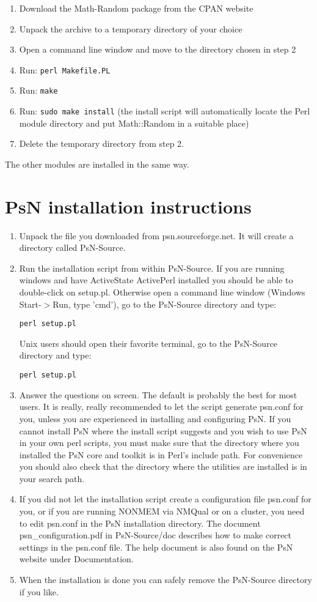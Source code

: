 \documentclass[a4paper,12pt]{article}
\begin{document}
\begin{enumerate}
\item Download the Math-Random package from the CPAN website 
\item Unpack the archive to a temporary directory of your choice 
\item Open a command line window and move to the directory chosen in step 2 
\item Run: \verb|perl Makefile.PL|
\item Run: \verb|make| 
\item Run: \verb|sudo make install| (the install script will automatically locate the Perl module directory and put Math::Random in a suitable place) 
\item Delete the temporary directory from step 2.
\end{enumerate}

The other modules are installed in the same way.

\section{PsN installation instructions}

\begin{enumerate}
\item Unpack the file you downloaded from psn.sourceforge.net. It will create a directory called PsN-Source.
\item Run the installation script from within PsN-Source. If you are running windows and have ActiveState ActivePerl installed you should be able to double-click on setup.pl. Otherwise open a command line window (Windows Start-$>$Run, type 'cmd'), go to the PsN-Source directory and type: 
\begin{verbatim}
perl setup.pl
\end{verbatim}
Unix users should open their favorite terminal, go to the PsN-Source directory and type:
\begin{verbatim}
perl setup.pl
\end{verbatim}
\item Answer the questions on screen. The default is probably the best for most users. It is really, really recommended to let the script generate psn.conf for you, unless you are experienced in installing and configuring PsN.
If you cannot install PsN where the install script suggests and you wish to use PsN in your own perl scripts, you must make sure that the directory where you installed the PsN core and toolkit is in Perl's include path. For convenience you should also check that the directory where the utilities are installed is in your search path. 
\item If you did not let the installation script create a configuration file psn.conf for you, or if you are running NONMEM via NMQual or on a cluster, you need to edit psn.conf in the PsN installation directory. The document psn\_configuration.pdf in PsN-Source/doc describes how to make correct settings in the psn.conf file. The help document is also found on the PsN website under Documentation.
\item When the installation is done you can safely remove the PsN-Source directory if you like. 
\end{enumerate}
\end{document}
